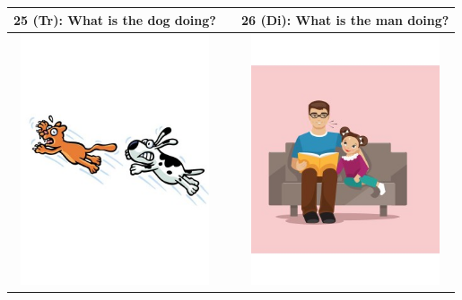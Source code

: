\begin{tabular}{|c|c|c|}
\hline
25 (Tr): What is the dog doing? && 26 (Di): What is the man doing? \\
\hline
\includegraphics[width=15em,trim=0 0 0 -3]{figures/I25.jpg} & & \includegraphics[width=15em,trim=0 0 0 -3]{figures/I26.jpg} \\
\hline
\end{tabular}
\vspace{1em} \\


